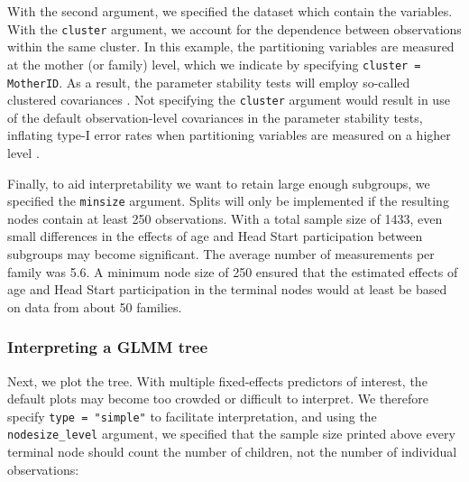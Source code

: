 \documentclass[doc,floatsintext,natbib]{apa7}
\begin{document}
With the second argument, we specified the dataset which contain the variables. With the \texttt{cluster} argument, we account for the dependence between observations within the same cluster. In this example, the partitioning variables are measured at the mother (or family) level, which we indicate by specifying \texttt{cluster = MotherID}. As a result, the parameter stability tests will employ so-called clustered covariances \citep{ZeilyKoll20}. Not specifying the \texttt{cluster} argument would result in use of the default observation-level covariances in the parameter stability tests, inflating type-I error rates when partitioning variables are measured on a higher level \citep{FokkyZeil24}. 
 

Finally, to aid interpretability we want to retain large enough subgroups, we specified the \texttt{minsize} argument. Splits will only be implemented if the resulting nodes contain at least 250 observations. With a total sample size of 1433, even small differences in the effects of age and Head Start participation between subgroups may become significant. The average number of measurements per family was 5.6. A minimum node size of 250 ensured that the estimated effects of age and Head Start participation in the terminal nodes would at least be based on data from about 50 families.


\subsubsection{Interpreting a GLMM tree}

Next, we plot the tree. With multiple fixed-effects predictors of interest, the default plots may become too crowded or difficult to interpret. We therefore specify \verb|type = "simple"| to facilitate interpretation, and using the \verb|nodesize_level| argument, we specified that the sample size printed above every terminal node should count the number of children, not the number of individual observations:
\end{document}

